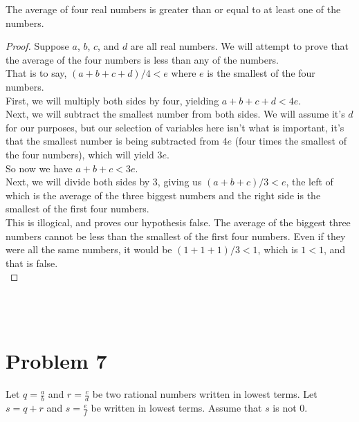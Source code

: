 \documentclass{amsart}
\theoremstyle{definition}
\theoremstyle{Exercise}
\theoremstyle{remark}
\theoremstyle{rule}
\numberwithin{equation}{section}
\begin{document}
The average of four real numbers is greater than or equal to at least one of the numbers.\\
\begin{proof}
Suppose $a$, $b$, $c$, and $d$ are all real numbers. We will attempt to prove that the average of the four numbers is less than any of the numbers.\\
That is to say, $(a + b + c + d)/4 < e$ where $e$ is the smallest of the four numbers.\\
First, we will multiply both sides by four, yielding $a + b + c + d < 4e$.\\
Next, we will subtract the smallest number from both sides. We will assume it's $d$ for our purposes, but our selection of variables here isn't what is important, it's that the smallest number is being subtracted from $4e$ (four times the smallest of the four numbers), which will yield $3e$.\\
So now we have $a + b + c < 3e$.\\
Next, we will divide both sides by 3, giving us $(a + b + c)/3 < e$, the left of which is the average of the three biggest numbers and the right side is the smallest of the first four numbers.\\
This is illogical, and proves our hypothesis false. The average of the biggest three numbers cannot be less than the smallest of the first four numbers. Even if they were all the same numbers, it would be $(1 + 1 + 1)/3 < 1$, which is $1 < 1$, and that is false.\\ 
\end{proof}
\\\\



 \newpage

\section*{Problem 7}

Let $\displaystyle q = \frac{a}{b}$ and $\displaystyle r = \frac{c}{d}$ be two rational numbers written in lowest terms. Let $s = q + r$ and $\displaystyle s = \frac{e}{f}$ be written in lowest terms. Assume that $s$ is not $0$.\\
\end{document}
